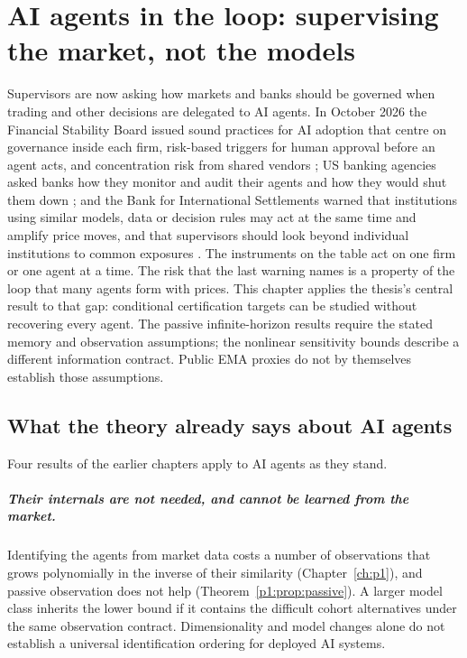 \chapter{AI agents in the loop: supervising the market, not the models}\label{ch:ai}

Supervisors are now asking how markets and banks should be governed when trading and other decisions are delegated to AI agents. In October 2026 the Financial Stability Board issued sound practices for AI adoption that centre on governance inside each firm, risk-based triggers for human approval before an agent acts, and concentration risk from shared vendors \citep{t:fsb2026}; US banking agencies asked banks how they monitor and audit their agents and how they would shut them down \citep{t:reuters2026}; and the Bank for International Settlements warned that institutions using similar models, data or decision rules may act at the same time and amplify price moves, and that supervisors should look beyond individual institutions to common exposures \citep{t:bis2026}. The instruments on the table act on one firm or one agent at a time. The risk that the last warning names is a property of the loop that many agents form with prices. This chapter applies the thesis's central result to that gap: conditional certification targets can be studied without recovering every agent. The passive infinite-horizon results require the stated memory and observation assumptions; the nonlinear sensitivity bounds describe a different information contract. Public EMA proxies do not by themselves establish those assumptions.

\section{What the theory already says about AI agents}\label{sec:ai_map}

Four results of the earlier chapters apply to AI agents as they stand.

\paragraph{Their internals are not needed, and cannot be learned from the market.} Identifying the agents from market data costs a number of observations that grows polynomially in the inverse of their similarity (Chapter~\ref{ch:p1}), and passive observation does not help (Theorem~\ref{p1:prop:passive}). A larger model class inherits the lower bound if it contains the difficult cohort alternatives under the same observation contract. Dimensionality and model changes alone do not establish a universal identification ordering for deployed AI systems.

